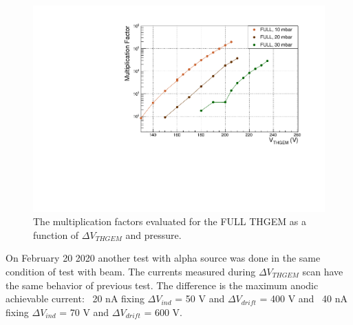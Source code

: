\documentclass[a4paper, 11 pt]{article}
\newcommand{\Vind}{$\Delta V_{ind}$}
\newcommand{\Vthgem}{$\Delta V_{THGEM}$}
\newcommand{\Vdrift}{$ \Delta V_{drift}$}
\begin{document}
\begin{figure}[!t]
	\centering
	\includegraphics[width=\textwidth]{Immagini/MFvsTHGEM_FULL.pdf}
	\caption{The multiplication factors evaluated for the FULL THGEM as a function of \Vthgem{} and pressure.}
	\label{fig:multiplication_factor_FULL}
\end{figure}

On February 20 2020 another test with alpha source was done in the same condition of test with beam. The currents measured during \Vthgem{} scan have the same behavior of previous test. The difference is the maximum anodic achievable current: ~20 nA fixing \Vind{} = 50 V and \Vdrift{} = 400 V and ~40 nA fixing \Vind{} = 70 V and \Vdrift{} = 600 V.
\end{document}
